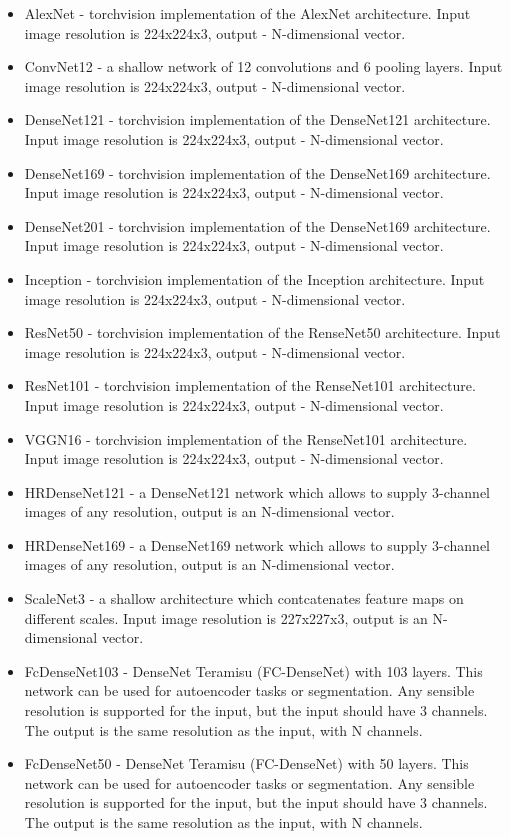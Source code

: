 \documentclass[a4paper, 11pt]{article}
\begin{document}
\begin{itemize}
    \item AlexNet - torchvision implementation of the AlexNet architecture. Input image resolution is 224x224x3, output - N-dimensional vector.
    \item ConvNet12 - a shallow network of 12 convolutions and 6 pooling layers. Input image resolution is 224x224x3, output - N-dimensional vector.
    \item DenseNet121 - torchvision implementation of the DenseNet121 architecture. Input image resolution is 224x224x3, output - N-dimensional vector.
    \item DenseNet169 - torchvision implementation of the DenseNet169 architecture. Input image resolution is 224x224x3, output - N-dimensional vector.
    \item DenseNet201 - torchvision implementation of the DenseNet169 architecture. Input image resolution is 224x224x3, output - N-dimensional vector.
    \item Inception - torchvision implementation of the Inception architecture. Input image resolution is 224x224x3, output - N-dimensional vector.
    \item ResNet50 - torchvision implementation of the RenseNet50 architecture. Input image resolution is 224x224x3, output - N-dimensional vector.
    \item ResNet101 - torchvision implementation of the RenseNet101 architecture. Input image resolution is 224x224x3, output - N-dimensional vector.
    \item VGGN16 - torchvision implementation of the RenseNet101 architecture. Input image resolution is 224x224x3, output - N-dimensional vector.
    \item HRDenseNet121 - a DenseNet121 network which allows to supply 3-channel images of any resolution, output is an N-dimensional vector. 
    \item HRDenseNet169 - a DenseNet169 network which allows to supply 3-channel images of any resolution, output is an N-dimensional vector. 
    \item ScaleNet3 - a shallow architecture which contcatenates feature maps on different scales. Input image resolution is 227x227x3, output is an N-dimensional vector.
    \item FcDenseNet103 - DenseNet Teramisu (FC-DenseNet) with 103 layers. This network can be used for autoencoder tasks or segmentation. Any sensible resolution is supported for the input, but the input should have 3 channels. The output is the same resolution as the input, with N channels.
    \item FcDenseNet50 - DenseNet Teramisu (FC-DenseNet) with 50 layers. This network can be used for autoencoder tasks or segmentation. Any sensible resolution is supported for the input, but the input should have 3 channels. The output is the same resolution as the input, with N channels.

\end{itemize}
\end{document}
